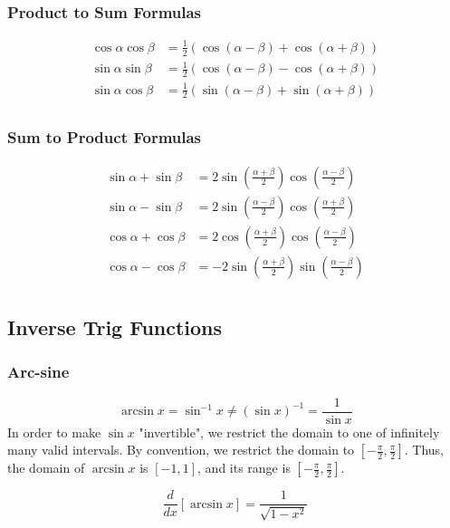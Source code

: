 \documentclass{article}
\begin{document}
\subsubsection{Product to Sum Formulas}
\begin{align*}
    \cos{\alpha}\cos{\beta}&=\frac{1}{2}\left(\cos\left(\alpha-\beta\right)+\cos{\left(\alpha+\beta\right)}\right)\\
    \sin{\alpha}\sin{\beta}&=\frac{1}{2}\left(\cos\left(\alpha-\beta\right)-\cos{\left(\alpha+\beta\right)}\right)\\
    \sin{\alpha}\cos{\beta}&=\frac{1}{2}\left(\sin\left(\alpha-\beta\right)+\sin{\left(\alpha+\beta\right)}\right)\\
\end{align*}

\subsubsection{Sum to Product Formulas}
\begin{align*}
    \sin{\alpha}+\sin{\beta}&=2\sin{\left(\frac{\alpha+\beta}{2}\right)}\cos{\left(\frac{\alpha-\beta}{2}\right)}\\
    \sin{\alpha}-\sin{\beta}&=2\sin{\left(\frac{\alpha-\beta}{2}\right)}\cos{\left(\frac{\alpha+\beta}{2}\right)}\\
    \cos{\alpha}+\cos{\beta}&=2\cos{\left(\frac{\alpha+\beta}{2}\right)}\cos{\left(\frac{\alpha-\beta}{2}\right)}\\
    \cos{\alpha}-\cos{\beta}&=-2\sin{\left(\frac{\alpha+\beta}{2}\right)}\sin{\left(\frac{\alpha-\beta}{2}\right)}\\
\end{align*}

\subsection{Inverse Trig Functions}
\subsubsection{Arc-sine}
$$\arcsin{x}=\sin^{-1}x\ne\left(\sin{x}\right)^{-1}=\frac{1}{\sin{x}}$$
In order to make $\sin{x}$ "invertible", we restrict the domain to one of infinitely many valid intervals. By convention, we restrict the domain to $\left[-\frac{\pi}{2},\frac{\pi}{2}\right]$. Thus, the domain of $\arcsin{x}$ is $[-1,1]$, and its range is $\left[-\frac{\pi}{2},\frac{\pi}{2}\right]$.

$$\frac{d}{dx}\left[\arcsin{x}\right]=\frac{1}{\sqrt{1-x^2}}$$
\end{document}
